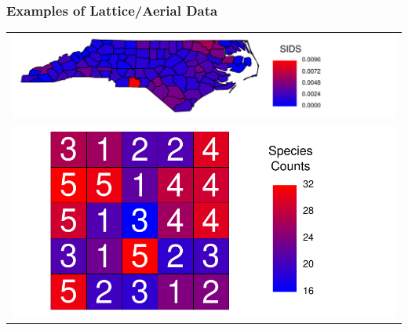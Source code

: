 \documentclass[mathserif,compress]{beamer}\usepackage{graphicx, color}
\makeatletter
\def\maxwidth{ %
  \ifdim\Gin@nat@width>\linewidth
    \linewidth
  \else
    \Gin@nat@width
  \fi
}
\makeatother
\begin{document}
\begin{frame}[fragile]
\frametitle{Examples of Lattice/Aerial Data}







	\begin{tabular} {c}


	{\centering \includegraphics[width=\maxwidth]{figure/rawSIDS-plot} }
 	\\



	{\centering \includegraphics[width=.6\maxwidth]{figure/fireDiv-plot} }


	\end{tabular}

\end{frame}
\end{document}
